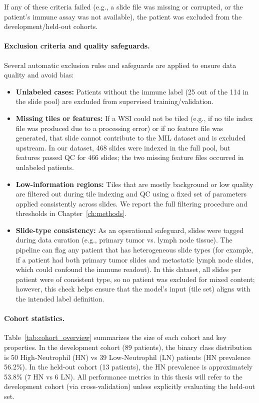 If any of these criteria failed (e.g., a slide file was missing or corrupted, or the patient’s immune assay was not available), the patient was excluded from the development/held-out cohorts.

\paragraph{Exclusion criteria and quality safeguards.}
Several automatic exclusion rules and safeguards are applied to ensure data quality and avoid bias:
\begin{itemize}
    \item \textbf{Unlabeled cases:} Patients without the immune label (25 out of the 114 in the slide pool) are excluded from supervised training/validation.
    \item \textbf{Missing tiles or features:} If a WSI could not be tiled (e.g., if no tile index file was produced due to a processing error) or if no feature file was generated, that slide cannot contribute to the MIL dataset and is excluded upstream. In our dataset, 468 slides were indexed in the full pool, but features passed QC for 466 slides; the two missing feature files occurred in unlabeled patients.
    \item \textbf{Low-information regions:} Tiles that are mostly background or low quality are filtered out during tile indexing and QC using a fixed set of parameters applied consistently across slides. We report the full filtering procedure and thresholds in Chapter~\ref{ch:methods}.
    \item \textbf{Slide-type consistency:} As an operational safeguard, slides were tagged during data curation (e.g., primary tumor vs. lymph node tissue). The pipeline can flag any patient that has heterogeneous slide types (for example, if a patient had both primary tumor slides and metastatic lymph node slides, which could confound the immune readout). In this dataset, all slides per patient were of consistent type, so no patient was excluded for mixed content; however, this check helps ensure that the model’s input (tile set) aligns with the intended label definition.
\end{itemize}

\paragraph{Cohort statistics.}
Table~\ref{tab:cohort_overview} summarizes the size of each cohort and key properties. In the development cohort (89 patients), the binary class distribution is 50 High-Neutrophil (HN) vs 39 Low-Neutrophil (LN) patients (HN prevalence 56.2\%). In the held-out cohort (13 patients), the HN prevalence is approximately 53.8\% (7 HN vs 6 LN). All performance metrics in this thesis will refer to the development cohort (via cross-validation) unless explicitly evaluating the held-out set.


